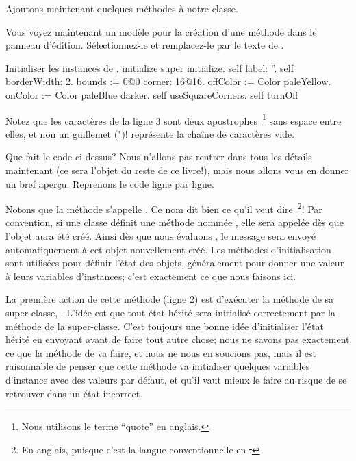 \documentclass[a4paper,10pt,twoside]{book}
\begin{document}
Ajoutons maintenant quelques méthodes à notre classe.

Vous voyez maintenant un modèle pour la création d'une méthode dans le panneau d'édition.
Sélectionnez-le et remplacez-le par le texte de .

\begin{numMethod}[scbecellinitialize]{Initialiser les instances de .}
initialize
   super initialize.
   self label: ''.
   self borderWidth: 2.
   bounds := 0@0 corner: 16@16.
   offColor := Color paleYellow.
   onColor := Color paleBlue darker.
   self useSquareCorners.
   self turnOff
\end{numMethod}

\noindent
Notez que les caractères  de la ligne 3 sont deux
apostrophes~\footnote{Nous utilisons le terme ``quote'' en anglais.} 
sans espace entre elles, et non un guillemet (")!
 représente la chaîne de caractères vide.


Que fait le code ci-dessus?  Nous n'allons pas rentrer dans tous les
détails maintenant (ce sera l'objet du reste de ce livre!), mais nous
allons vous en donner un bref aperçu. Reprenons le code ligne par ligne.

Notons que la méthode s'appelle .
Ce nom dit bien ce qu'il veut dire~\footnote{En anglais, puisque c'est
  la langue conventionnelle en \st.}!
Par convention, si une classe définit une méthode nommée , elle sera appelée d\`es que l'objet aura été créé.
Ainsi d\`es que nous évaluons , le message  sera envoyé automatiquement à cet objet nouvellement créé.
Les méthodes d'initialisation sont utilisées pour définir l'état des objets, généralement pour donner une valeur à leurs variables d'instances; c'est exactement ce que nous faisons ici.

La première action de cette méthode (ligne 2) est d'exécuter la méthode  de sa super-classe, .
L'idée est que tout état hérité sera initialisé correctement par la méthode  de la super-classe.
C'est toujours une bonne idée d'initialiser l'état hérité en envoyant
 avant de faire tout autre chose; nous ne savons
pas exactement ce que la méthode  de
 va faire, et nous ne nous en soucions pas, mais
il est raisonnable de penser que cette méthode va initialiser quelques
variables d'instance avec des valeurs par défaut, et qu'il vaut mieux
le faire au risque de se retrouver dans un état incorrect.
\end{document}
